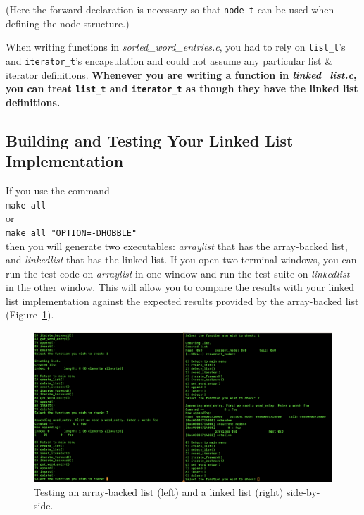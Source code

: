 (Here the forward declaration is necessary so that \lstinline{node_t} can be used when defining the node structure.)

When writing functions in \textit{sorted\_word\_entries.c}, you had to rely on \lstinline{list_t}'s and \lstinline{iterator_t}'s encapsulation and could not assume any particular list \& iterator definitions.
\textbf{Whenever you are writing a function in \textit{linked\_list.c}, you can treat \lstinline{list_t} and \lstinline{iterator_t} as though they have the linked list definitions.}


\subsection{Building and Testing Your Linked List Implementation} \label{subsec:BuildingLinkedList}

If you use the command \\
\verb+make all+ \\
or \\
\verb+make all "OPTION=-DHOBBLE"+ \\
then you will generate two executables: \textit{arraylist} that has the array-backed list, and \textit{linkedlist} that has the linked list.
If you open two terminal windows, you can run the test code on \textit{arraylist} in one window and run the test suite on \textit{linkedlist} in the other window.
This will allow you to compare the results with your linked list implementation against the expected results provided by the array-backed list (Figure~\ref{fig:SideBySideTesting}).

\begin{figure}
    \centering
    \includegraphics[width=6in]{SideBySideTesting}
    \caption{Testing an array-backed list (left) and a linked list (right) side-by-side.}
    \label{fig:SideBySideTesting}
\end{figure}

